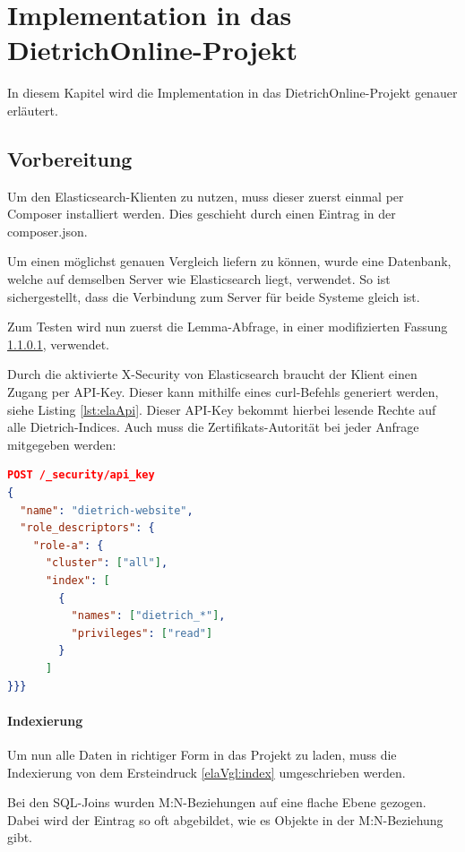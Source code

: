 \chapter{Implementation in das DietrichOnline-Projekt}

In diesem Kapitel wird die Implementation in das DietrichOnline-Projekt genauer erläutert.

\section{Vorbereitung}

Um den Elasticsearch-Klienten zu nutzen, muss dieser zuerst einmal per Composer installiert werden. Dies geschieht durch einen Eintrag in der composer.json.

Um einen möglichst genauen Vergleich liefern zu können, wurde eine Datenbank, welche auf demselben Server wie Elasticsearch liegt, verwendet. So ist sichergestellt, dass die Verbindung zum Server für beide Systeme gleich ist.

Zum Testen wird nun zuerst die Lemma-Abfrage, in einer modifizierten Fassung \ref{lemmaIndexierungEla}, verwendet.

Durch die aktivierte X-Security von Elasticsearch braucht der Klient einen Zugang per API-Key. Dieser kann mithilfe eines curl-Befehls generiert werden, siehe Listing \ref{lst:elaApi}. Dieser API-Key bekommt hierbei lesende Rechte auf alle Dietrich-Indices. Auch muss die Zertifikats-Autorität bei jeder Anfrage mitgegeben werden:

\begin{lstlisting}[language=JSON, frame=single, label={lst:elaApi}, caption=Code zur Generierung eines API-Keys,captionpos=b] 
POST /_security/api_key
{
  "name": "dietrich-website",
  "role_descriptors": { 
    "role-a": {
      "cluster": ["all"],
      "index": [
        {
          "names": ["dietrich_*"],
          "privileges": ["read"]
        }
      ]
}}}
\end{lstlisting}


\subsubsection{Indexierung}
\label{lemmaIndexierungEla}

Um nun alle Daten in richtiger Form in das Projekt zu laden, muss die Indexierung von dem Ersteindruck \ref{elaVgl:index} umgeschrieben werden. 

Bei den SQL-Joins wurden M:N-Beziehungen auf eine flache Ebene gezogen. Dabei wird der Eintrag so oft abgebildet, wie es Objekte in der M:N-Beziehung gibt. 

